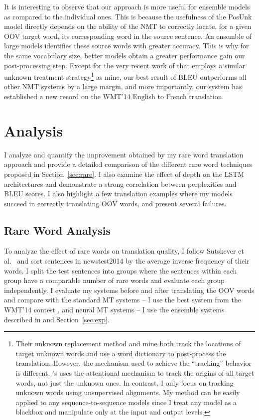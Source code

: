 It is interesting to observe that our approach is more useful for ensemble models as compared to the individual ones. 
This is because the usefulness of the PosUnk model directly
depends on the ability of the NMT to correctly locate, for a given OOV target word, its corresponding word in the source sentence.  An ensemble of large models identifies these source words with greater accuracy.  This is why for the same vocabulary size, better models obtain a greater performance gain our post-processing step. 
Except for the very recent work of  that employs a similar unknown treatment strategy\footnote{Their unknown replacement method and mine both track the locations of target unknown words and use a word dictionary to post-process the translation. However, the mechanism used to achieve the ``tracking'' behavior is different. 's uses the attentional mechanism to track the origins of all target words, not just the unknown ones. In contrast, I only focus on tracking unknown words using unsupervised alignments. My method can be easily applied to any sequence-to-sequence models since I treat any model as a blackbox and manipulate only at the input and output levels.} as mine, our best result of \bestbleuunk{} BLEU outperforms all other NMT systems by a large margin, and 
more importantly, our system has established a new record on the WMT'14 English to French translation.

\section{Analysis}
\label{sec:analysis}
I analyze and quantify the improvement obtained by my rare word translation approach and provide a detailed 
comparison of the different rare word techniques proposed in Section~\ref{sec:rare}. I also examine the effect of 
depth on the LSTM architectures and demonstrate a strong correlation between perplexities and BLEU scores. I also highlight 
a few translation examples where my models succeed in correctly translating OOV words, and present 
several failures.

\subsection{Rare Word Analysis}
\begin{sloppypar}
To analyze the effect of rare words on translation quality, 
I follow Sutskever et al.~\cite{sutskever14} and sort sentences in 
newstest2014 by the average inverse frequency of their words. 
I split the test sentences into groups where the sentences within each group have a comparable number of rare words
 and evaluate each group independently. I evaluate my 
systems before and after translating the OOV words and compare with 
the standard MT systems -- I use the best system from the WMT'14 contest \cite{durrani-EtAl:2014:W14-33},
and neural MT systems -- I use the ensemble systems described in \cite{sutskever14} and Section~\ref{sec:exp}.
\end{sloppypar}

